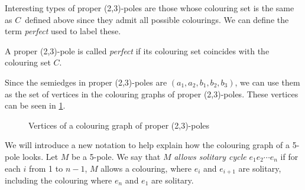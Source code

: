 Interesting types of proper (2,3)-poles are those whose colouring set is the same as $C$~defined above since they admit all possible colourings. We can define the term \textit{perfect} used to label these.

\begin{definition}
	A proper (2,3)-pole is called \textit{perfect} if its colouring set coincides with the colouring set $C$.
\end{definition}


Since the semiedges in proper (2,3)-poles are $(a_1,a_2,b_1,b_2,b_3)$, we can use them as the set of vertices in the colouring graphs of proper (2,3)-poles. These vertices can be seen in \cref{fig:proper-associated-vertices}.

\begin{figure}
	\centering
	
	\caption{Vertices of a colouring graph of proper (2,3)-poles}
	\label{fig:proper-associated-vertices}
\end{figure}

We will introduce a new notation to help explain how the colouring graph of a 5-pole looks. Let $M$ be a 5-pole. We say that $M$ \textit{allows solitary cycle} $e_1e_2\cdots e_n$ if for each $i$ from 1 to $n-1$, $M$ allows a colouring, where $e_i$ and $e_{i+1}$ are solitary, including the colouring where $e_n$ and $e_1$ are solitary.

